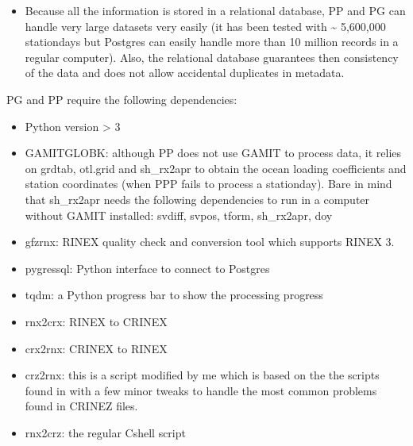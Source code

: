 \documentclass[letterpaper,10pt,english]{sphinxmanual}
\begin{document}
\begin{itemize}
\item {} 
\sphinxAtStartPar
Because all the information is stored in a relational database, PP and PG can handle very large datasets very easily (it has been tested with \textasciitilde{} 5,600,000 station\sphinxhyphen{}days but Postgres can easily handle more than 10 million records in a regular computer). Also, the relational database guarantees then consistency of the data and does not allow accidental duplicates in metadata.

\end{itemize}

\sphinxAtStartPar
PG and PP require the following dependencies:
\begin{itemize}
\item {} 
\sphinxAtStartPar
Python version \textgreater{} 3

\item {} 
\sphinxAtStartPar
GAMIT\sphinxhyphen{}GLOBK: although PP does not use GAMIT to process data, it relies on grdtab, otl.grid and sh\_rx2apr to obtain the ocean loading coefficients and station coordinates (when PPP fails to process a station\sphinxhyphen{}day). Bare in mind that sh\_rx2apr needs the following dependencies to run in a computer without GAMIT installed: svdiff, svpos, tform, sh\_rx2apr, doy

\item {} 
\sphinxAtStartPar
gfzrnx: RINEX quality check and conversion tool which supports RINEX 3.

\item {} 
\sphinxAtStartPar
pygressql: Python interface to connect to Postgres

\item {} 
\sphinxAtStartPar
tqdm: a Python progress bar to show the processing progress

\item {} 
\sphinxAtStartPar
rnx2crx: RINEX to CRINEX

\item {} 
\sphinxAtStartPar
crx2rnx: CRINEX to RINEX

\item {} 
\sphinxAtStartPar
crz2rnx: this is a script modified by me which is based on the the scripts found in  with a few minor tweaks to handle the most common problems found in CRINEZ files.

\item {} 
\sphinxAtStartPar
rnx2crz: the regular C\sphinxhyphen{}shell script


\end{itemize}
\end{document}

